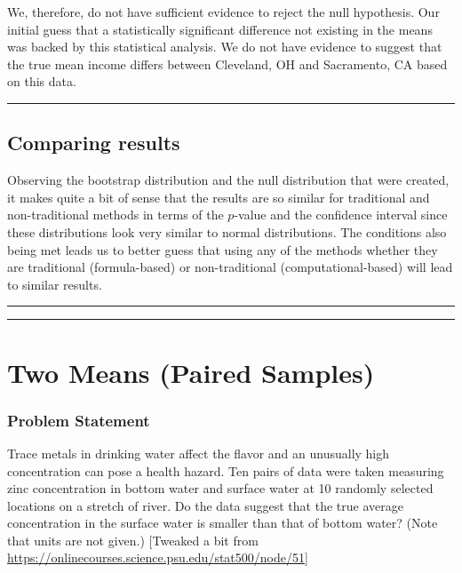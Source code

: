 \documentclass[]{tufte-book}
\let\oldrule=\rule
\renewcommand{\rule}[1]{\oldrule{\linewidth}}
\theoremstyle{definition}
\theoremstyle{definition}
\theoremstyle{remark}
\begin{document}
We, therefore, do not have sufficient evidence to reject the null
hypothesis. Our initial guess that a statistically significant
difference not existing in the means was backed by this statistical
analysis. We do not have evidence to suggest that the true mean income
differs between Cleveland, OH and Sacramento, CA based on this data.

\begin{center}\rule{0.5\linewidth}{\linethickness}\end{center}

\subsection{Comparing results}\label{comparing-results-3}

Observing the bootstrap distribution and the null distribution that were
created, it makes quite a bit of sense that the results are so similar
for traditional and non-traditional methods in terms of the \(p\)-value
and the confidence interval since these distributions look very similar
to normal distributions. The conditions also being met leads us to
better guess that using any of the methods whether they are traditional
(formula-based) or non-traditional (computational-based) will lead to
similar results.

\begin{center}\rule{0.5\linewidth}{\linethickness}\end{center}

\begin{center}\rule{0.5\linewidth}{\linethickness}\end{center}

\section{Two Means (Paired Samples)}\label{two-means-paired-samples}

\subsubsection{Problem Statement}\label{problem-statement-4}

Trace metals in drinking water affect the flavor and an unusually high
concentration can pose a health hazard. Ten pairs of data were taken
measuring zinc concentration in bottom water and surface water at 10
randomly selected locations on a stretch of river. Do the data suggest
that the true average concentration in the surface water is smaller than
that of bottom water? (Note that units are not given.) {[}Tweaked a bit
from \url{https://onlinecourses.science.psu.edu/stat500/node/51}{]}
\end{document}
